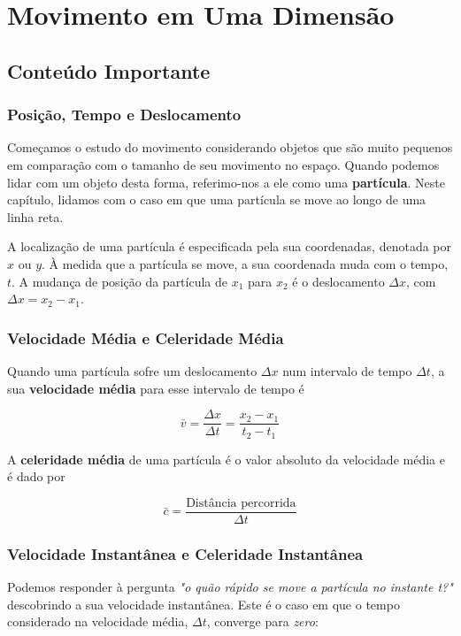 \section{Movimento em Uma Dimensão}
\subsection{Conteúdo Importante}
\subsubsection{Posição, Tempo e Deslocamento}

Começamos o estudo do movimento considerando objetos que são muito pequenos em comparação com o tamanho de seu movimento no espaço. Quando podemos lidar com um objeto desta forma, referimo-nos a ele como uma \textbf{partícula}. Neste capítulo, lidamos com o caso em que uma partícula se move ao longo de uma linha reta.

A localização de uma partícula é especificada pela sua coordenadas, denotada por $x$ ou $y$. À medida que a partícula se move, a sua coordenada muda com o tempo, $t$. A mudança de posição da partícula de $x_1$ para $x_2$ é o deslocamento $\Delta x$, com $\Delta x = x_2 - x_1$.

\subsubsection{Velocidade Média e Celeridade Média}
Quando uma partícula sofre um deslocamento $\Delta x$ num intervalo de tempo $\Delta t$, a sua \textbf{velocidade média} para esse intervalo de tempo é

\begin{equation}
    \bar{v}=\frac{\Delta x}{\Delta t}=\frac{x_2-x_1}{t_2-t_1}
\end{equation}

A \textbf{celeridade média} de uma partícula é o valor absoluto da velocidade média e é dado por

\begin{equation}
    \bar{c}=\frac{\text{Distância percorrida}}{\Delta t}
\end{equation}

\subsubsection{Velocidade Instantânea e Celeridade Instantânea}
Podemos responder à pergunta \emph{"o quão rápido se move a partícula no instante t?"} descobrindo a sua velocidade instantânea. Este é o caso em que o tempo considerado na velocidade média, $\Delta t$, converge para \emph{zero}:

